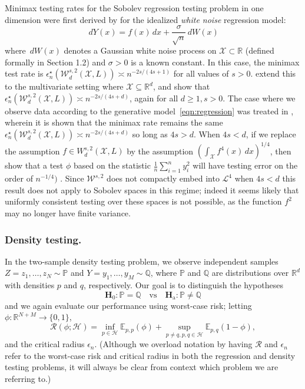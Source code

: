 \documentclass{article}
\newcommand{\Reals}{\mathbb{R}}
\newcommand{\1}{\mathbf{1}}
\newcommand{\Pbb}{\mathbb{P}}
\newcommand{\Ebb}{\mathbb{E}}
\newcommand{\Qbb}{\mathbb{Q}}
\theoremstyle{alden}
\theoremstyle{aldenthm}
\theoremstyle{definition}
\theoremstyle{remark}
\begin{document}
Minimax testing rates for the Sobolev regression testing problem in one dimension were first derived by \citet{ingster82} for the idealized \emph{white noise} regression model:
\begin{equation}
\label{eqn:gaussian_white_noise}
\,dY(x) = f(x) \,dx + \frac{\sigma}{\sqrt{n}}\,dW(x)
\end{equation}
where $\,dW(x)$ denotes a Gaussian white noise process on $\mathcal{X} \subset \Reals$ (defined formally in \citet{gine16} Section 1.2) and $\sigma > 0$ is a known constant. In this case, the minimax test rate is $\epsilon_n^{\star}(\mathcal{W}_d^{s,2}(\mathcal{X}, L)) \asymp n^{-2s/(4s + 1)}$ for all values of $s > 0$. \citet{ingster05} extend this to the multivariate setting where $\mathcal{X} \subseteq \Reals^d$, and show that $\epsilon_n^{\star}(\mathcal{W}_d^{s,2}(\mathcal{X}, L)) \asymp n^{-2s/(4s + d)}$, again for all $d \geq 1, s > 0$. The case where we observe data according to the generative model~\eqref{eqn:regression} was treated in \cite{ingster09}, wherein it is shown that the minimax rate remains the same  $\epsilon_n^{\star}(\mathcal{W}_d^{s,2}(\mathcal{X}, L)) \asymp n^{-2s/(4s + d)}$ so long as $4s > d$. When $4s < d$, if we replace the assumption $f \in W_d^{s,2}(\mathcal{X},L)$ by the assumption $\left(\int_{\mathcal{X}} f^4(x) \,dx\right)^{1/4}$, then \citet{guerre02} show that a test $\phi$ based on the statistic $\frac{1}{n}\sum_{i = 1}^{n}y_i^2$ will have testing error on the order of $n^{-1/4})$ . Since $\mathcal{W}^{s,2}$ does not compactly embed into $\mathcal{L}^4$ when $4s < d$ this result does not apply to Sobolev spaces in this regime; indeed it seems likely that uniformly consistent testing over these spaces is not possible, as the function $f^2$ may no longer have finite variance.

\subsubsection{Density testing.}
\label{subsubsec:density_testing}

In the two-sample density testing problem, we observe independent samples $Z = z_1,\ldots,z_N \sim \Pbb$ and $Y = y_1,\ldots,y_M \sim \Qbb$, where $\Pbb$ and $\Qbb$ are distributions over $\Reals^d$ with densities $p$ and $q$, respectively. Our goal is to distinguish the hypotheses
\begin{equation*}
\mathbf{H}_0: \Pbb = \Qbb \quad \textrm{vs} \quad \mathbf{H}_{\textrm{a}}: \Pbb \neq \Qbb
\end{equation*}
and we again evaluate our performance using worst-case risk; letting $\phi:\Reals^{N + M} \to \{0,1\}$, 
\begin{equation*}
\mathcal{R}(\phi; \mathcal{H}) = \inf_{p \in \mathcal{H}}\Ebb_{p,p}(\phi) + \sup_{p \neq q, p,q \in \mathcal{H}} \Ebb_{p,q}(1 - \phi),
\end{equation*}
and the critical radius $\epsilon_n$. (Although we overload notation by having $\mathcal{R}$ and $\epsilon_n$ refer to the worst-case risk and critical radius in both the regression and density testing problems, it will always be clear from context which problem we are referring to.)
\end{document}
